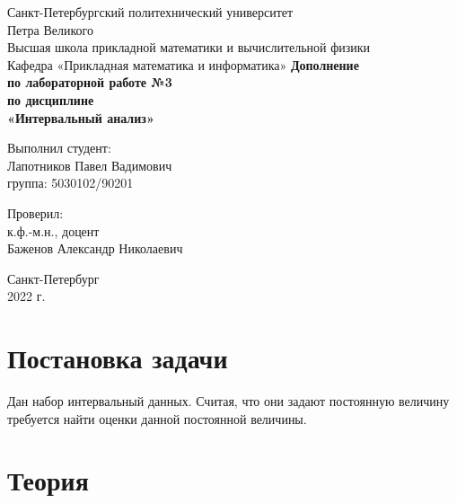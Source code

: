 \documentclass[12pt,a4paper]{article}
\begin{document}
    \begin{titlepage}
		\begin{center}		
			\vfill	
			Санкт-Петербургский политехнический университет \\
			Петра Великого\\
			\vskip 1cm
			Высшая школа прикладной математики и вычислительной физики \\
			Кафедра «Прикладная математика и информатика»
			\vfill
			\textbf{Дополнение\\
				по лабораторной работе №3\\
				по дисциплине\\
				«Интервальный анализ»\\}
			\vfill
		\end{center}
		\vfill
		\hfill
		\begin{minipage}{0.4\textwidth}
			Выполнил студент:\\
			Лапотников Павел Вадимович\\
			группа: 5030102/90201\\
		\end{minipage}
		\vfill
		\hfill 
		\begin{minipage}{0.4\textwidth}
			Проверил:\\
			к.ф.-м.н., доцент\\
			Баженов Александр Николаевич\
		\end{minipage}
		\vfill
		\hfill 
		\begin{center}
			Санкт-Петербург\\2022 г.
		\end{center}
	\end{titlepage}
	
	\tableofcontents
	\listoffigures
	\pagebreak
     
    \section{Постановка задачи}
    
    Дан набор интервальный данных. Считая, что они задают постоянную величину требуется найти оценки данной постоянной величины.

    \section{Теория}
\end{document}

